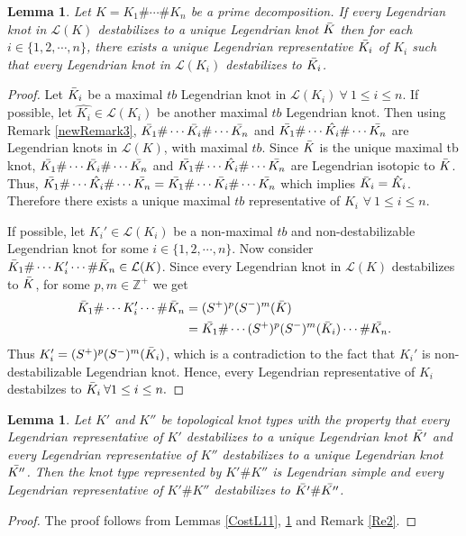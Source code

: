 \documentclass[11pt]{amsart}
\numberwithin{equation}{section}
\theoremstyle{plain}
\newtheorem{Lemma}[equation]{Lemma}
\theoremstyle{definition}
\theoremstyle{remark} \newtheorem{remark}[equation]{Remark}
\theoremstyle{remark} \newtheorem{observation}[equation]{Observation}
\begin{document}
\begin{Lemma}\label{CostL14}
    Let $K=K_1\#\cdots\#K_n$ be a prime decomposition. If every Legendrian knot in $\mathcal{L}(K)$ destabilizes to a unique Legendrian knot $\Bar{K}$ then for each $i \in \{1,2,\cdots,n\}$, there exists a unique Legendrian representative $\Bar{K_i}$ of $K_i$ such that every Legendrian knot in $\mathcal{L}(K_i)$ destabilizes to $\Bar{K_i}$.
\end{Lemma}

\begin{proof}
    Let $\Bar{K}_i$ be a maximal $tb$ Legendrian knot in $\mathcal{L}(K_i) \ \forall \  1\leq i\leq n.$ If possible, let $\hat{K_i}\in \mathcal{L}
    (K_i)$ be another maximal $tb$ Legendrian knot. Then using Remark \ref{newRemark3}, $\Bar{K_1}\#\cdots \Bar{K_i}\#\cdots \Bar{K_n}$ and $
    \Bar{K_1}\#\cdots\hat{K_i}\#\cdots \Bar{K_n}$ are Legendrian knots in $\mathcal{L}(K)$, with maximal $tb$. Since $\Bar{K}$ is the unique maximal tb knot, $\Bar{K_1}\#\cdots \Bar{K_i}\#\cdots \Bar{K_n}$ and $
    \Bar{K_1}\#\cdots\hat{K_i}\#\cdots \Bar{K_n}$ are Legendrian isotopic to $\Bar{K}$. Thus, $\Bar{K_1}\#\cdots\hat{K_i}\#\cdots \Bar{K_n}
    =\Bar{K_1}\#\cdots \Bar{K_i}\#\cdots \Bar{K_n}$ which implies $\Bar{K}_i=\hat{K}_i$. Therefore there exists a unique maximal $tb$ representative of $K_i$ $\forall \ 1\leq i\leq n$.

    If possible, let $K_i'\in \mathcal{L}(K_i)$ be a non-maximal $tb$ and non-destabilizable Legendrian knot for some $i\in \{1,2,\cdots,n\}$. Now consider $\Bar{K}_1\#\cdots K_i'\cdots \#\Bar{K}_n\in \mathcal{L}(K)$. Since every Legendrian knot in $\mathcal{L}(K)$ destabilizes to $\Bar{K}$, for some $p,m\in \mathbb{Z}^+$ we get
    \begin{align*}
        \Bar{K}_1\#\cdots K_i'\cdots \#\Bar{K}_n&=(S^+)^{p}(S^-)^{m}(\Bar{K})\\
        &=\Bar{K_1}\#\cdots(S^+)^{p}(S^-)^m(\Bar{K}_i)\cdots\#\Bar{K_n}.
    \end{align*}
    Thus $K_i'=(S^+)^{p}(S^-)^{m}(\Bar{K}_i)$, which is a contradiction to the fact that $K_i'$ is non-destabilizable Legendrian knot. Hence, every Legendrian representative of $K_i$ destabilzes to $\Bar{K}_i \: \forall 1\leq i\leq n.$
\end{proof}

\begin{Lemma}\label{CostL15}
Let $K'$ and $K''$ be topological knot types with the property that every Legendrian representative of $K'$ destabilizes to a unique Legendrian knot $\Bar{K'}$ and every Legendrian representative of $K''$ destabilizes to a unique Legendrian knot $\Bar{K''}$. Then the knot type represented by $K'\#K''$ is Legendrian simple and every Legendrian representative of $K'\#K''$ destabilizes to $\Bar{K'}\#\Bar{K''}$.
\end{Lemma}
\begin{proof}
    The proof follows from Lemmas \ref{CostL11}, \ref{CostL14} and Remark \ref{Re2}.
\end{proof}
\end{document}
